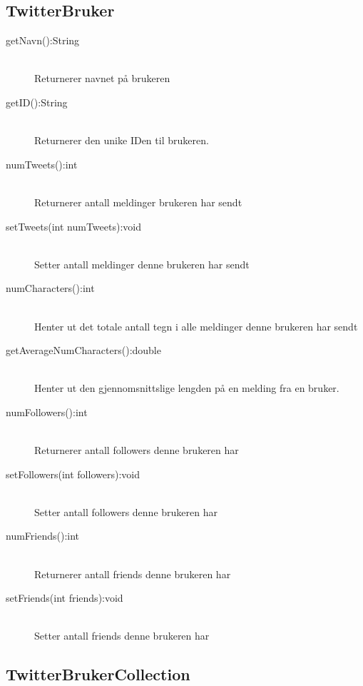 \documentclass{article}
\begin{document}
\subsection{TwitterBruker}
\label{subsec:TwitterBruker}
\begin{description}
\item [getNavn():String] \ \\
  Returnerer navnet på brukeren
\item [getID():String] \ \\
  Returnerer den unike IDen til brukeren.
\item [numTweets():int] \ \\
  Returnerer antall meldinger brukeren har sendt
\item [setTweets(int numTweets):void] \ \\
  Setter antall meldinger denne brukeren har sendt
\item [numCharacters():int] \ \\
  Henter ut det totale antall tegn i alle meldinger denne brukeren har sendt
\item [getAverageNumCharacters():double] \ \\
  Henter ut den gjennomsnittslige lengden på en melding fra en bruker.
\item [numFollowers():int] \ \\
  Returnerer antall followers denne brukeren har
\item [setFollowers(int followers):void] \ \\
  Setter antall followers denne brukeren har
\item [numFriends():int] \ \\
  Returnerer antall friends denne brukeren har
\item [setFriends(int friends):void] \ \\
  Setter antall friends denne brukeren har
\end{description}
\newpage
\subsection{TwitterBrukerCollection}
\label{subsec:TwitterBrukerCollection}
\end{document}
